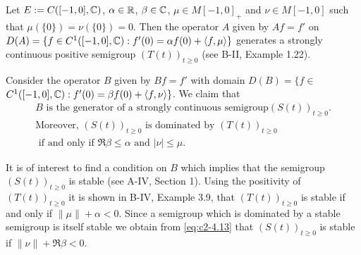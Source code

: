 \begin{example}\label{ex:c2-4.14}
Let $E := C([-1,0],\mathbb{C})$, $\alpha \in \mathbb{R}$, $\beta \in \mathbb{C}$, $\mu \in M[-1,0]_{+}$
and $\nu \in M[-1,0]$ such that $\mu(\{0\}) = \nu(\{0\}) = 0$.
Then the operator $A$ given by $Af = f'$ on $D(A) = \{f \in C^{1}([-1,0],\mathbb{C}) : f'(0) = \alpha f(0) + \langle f,\mu\rangle\}$ generates a strongly continuous positive semigroup $(T(t))_{t \geq 0}$
(see B-II, Example 1.22).
\end{example}
Consider the operator $B$ given by $Bf = f'$ with domain $D(B) = \{f \in$
$C^{1}([-1,0],\mathbb{C}) : f'(0) = \beta f(0) + \langle f,\nu \rangle\}$.
We claim that
\begin{equation}\label{eq:c2-4.13}
\begin{array}{l}
B \,\, \text{is the generator of a strongly continuous semigroup} (S(t))_{t \geq 0}.\\
\text{Moreover, } (S(t))_{t \geq 0} \text{ is dominated by } (T(t))_{t \geq 0}\\
\text{ if and only if } \Re\beta \leq \alpha \text{ and } |\nu| \leq \mu.
\end{array}
\end{equation}

\begin{remark*}
It is of interest to find a condition on $B$ which implies that the semigroup $(S(t))_{t \geq 0}$ is stable (see A-IV, Section 1).
Using the positivity of $(T(t))_{t \geq 0}$ it is shown in B-IV, Example 3.9, that
$(T(t))_{t \geq 0}$ is stable if and only if $\|\mu\| + \alpha < 0$.
Since a semigroup which is dominated by a stable semigroup is itself stable we obtain from \eqref{eq:c2-4.13} that $(S(t))_{t \geq 0}$ is stable if $\|\nu\| + \Re\beta < 0$.
\end{remark*}

